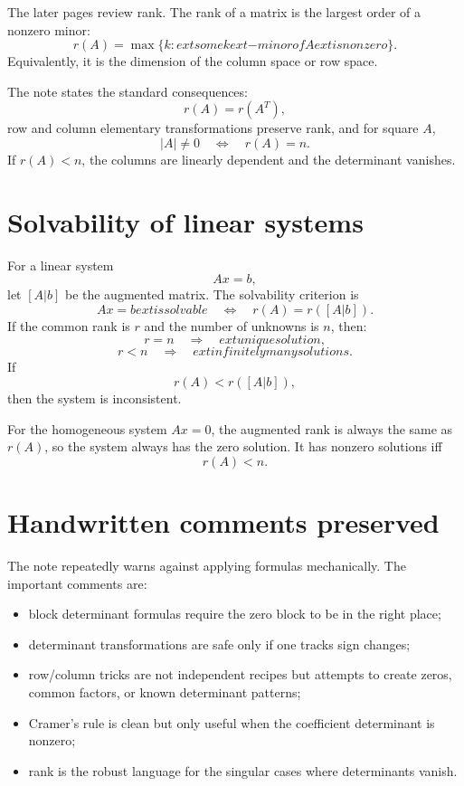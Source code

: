 The later pages review rank.  The rank of a matrix is the largest order of a nonzero minor:
\[
  r(A)=\max\{k:	ext{some }k	ext{-minor of }A	ext{ is nonzero}\}.
\]
Equivalently, it is the dimension of the column space or row space.

The note states the standard consequences:
\[
  r(A)=r(A^T),
\]
row and column elementary transformations preserve rank, and for square $A$,
\[
  |A|\ne0\quad\Longleftrightarrow\quad r(A)=n.
\]
If $r(A)<n$, the columns are linearly dependent and the determinant vanishes.

\section{Solvability of linear systems}

For a linear system
\[
  Ax=b,
\]
let $[A|b]$ be the augmented matrix.  The solvability criterion is
\[
  Ax=b	ext{ is solvable}
  \quad\Longleftrightarrow\quad
  r(A)=r([A|b]).
\]
If the common rank is $r$ and the number of unknowns is $n$, then:
\[
  r=n\quad\Longrightarrow\quad	ext{unique solution},
\]
\[
  r<n\quad\Longrightarrow\quad	ext{infinitely many solutions}.
\]
If
\[
  r(A)<r([A|b]),
\]
then the system is inconsistent.

For the homogeneous system $Ax=0$, the augmented rank is always the same as $r(A)$, so the system always has the zero solution.  It has nonzero solutions iff
\[
  r(A)<n.
\]

\section{Handwritten comments preserved}

The note repeatedly warns against applying formulas mechanically.  The important comments are:

\begin{itemize}
  \item block determinant formulas require the zero block to be in the right place;
  \item determinant transformations are safe only if one tracks sign changes;
  \item row/column tricks are not independent recipes but attempts to create zeros, common factors, or known determinant patterns;
  \item Cramer's rule is clean but only useful when the coefficient determinant is nonzero;
  \item rank is the robust language for the singular cases where determinants vanish.
\end{itemize}

